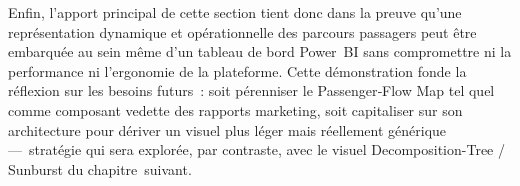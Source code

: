 Enfin, l’apport principal de cette section tient donc dans la preuve qu’une représentation dynamique et opérationnelle des parcours passagers peut être embarquée au sein même d’un tableau de bord Power BI sans compromettre ni la performance ni l’ergonomie de la plateforme. Cette démonstration fonde la réflexion sur les besoins futurs : soit pérenniser le Passenger‑Flow Map tel quel comme composant vedette des rapports marketing, soit capitaliser sur son architecture pour dériver un visuel plus léger mais réellement générique — stratégie qui sera explorée, par contraste, avec le visuel Decomposition-Tree / Sunburst du chapitre suivant.